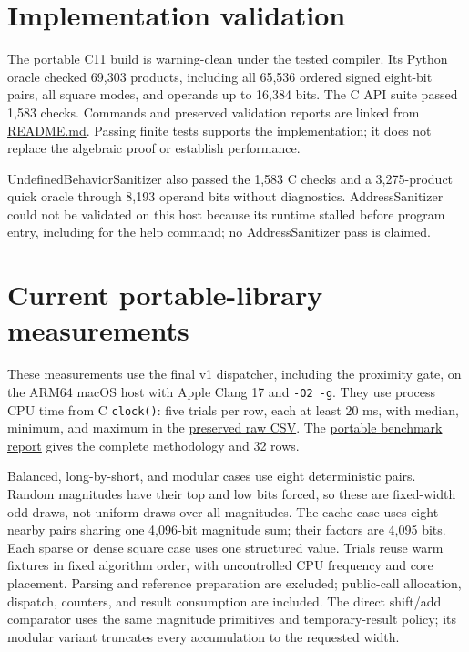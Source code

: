\documentclass[11pt,a4paper]{article}
\begin{document}
\section{Implementation validation}

The portable C11 build is warning-clean under the tested compiler. Its Python oracle checked 69,303 products, including all 65,536 ordered signed eight-bit pairs, all square modes, and operands up to 16,384 bits. The C API suite passed 1,583 checks. Commands and preserved validation reports are linked from \href{\detokenize{README.md}}{README.md}. Passing finite tests supports the implementation; it does not replace the algebraic proof or establish performance.

UndefinedBehaviorSanitizer also passed the 1,583 C checks and a 3,275-product quick oracle through 8,193 operand bits without diagnostics. AddressSanitizer could not be validated on this host because its runtime stalled before program entry, including for the help command; no AddressSanitizer pass is claimed.

\section{Current portable-library measurements}

These measurements use the final v1 dispatcher, including the proximity gate, on the ARM64 macOS host with Apple Clang 17 and \texttt{-O2 -g}. They use process CPU time from C \texttt{clock()}: five trials per row, each at least 20 ms, with median, minimum, and maximum in the \href{\detokenize{.scratchpad/portable-v1/benchmarks.csv}}{preserved raw CSV}. The \href{\detokenize{portable-results.md}}{portable benchmark report} gives the complete methodology and 32 rows.

Balanced, long-by-short, and modular cases use eight deterministic pairs. Random magnitudes have their top and low bits forced, so these are fixed-width odd draws, not uniform draws over all magnitudes. The cache case uses eight nearby pairs sharing one 4,096-bit magnitude sum; their factors are 4,095 bits. Each sparse or dense square case uses one structured value. Trials reuse warm fixtures in fixed algorithm order, with uncontrolled CPU frequency and core placement. Parsing and reference preparation are excluded; public-call allocation, dispatch, counters, and result consumption are included. The direct shift/add comparator uses the same magnitude primitives and temporary-result policy; its modular variant truncates every accumulation to the requested width.
\end{document}
